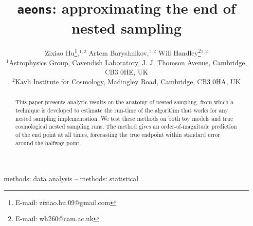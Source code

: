 \documentclass[usenatbib]{mnras}
\title[\texttt{aeons}]{\texttt{aeons}: approximating the end of nested sampling}
\author[Z. Hu et al.]{Zixiao Hu\thanks{E-mail: zixiao.hu.09@gmail.com},$^{1,2}$  Artem Baryshnikov,$^{1,2}$  Will Handley\thanks{E-mail: wh260@cam.ac.uk}$^{1,2}$
\\
$^{1}$Astrophysics Group, Cavendish Laboratory, J. J. Thomson Avenue, Cambridge, CB3 0HE, UK\\
$^{2}$Kavli Institute for Cosmology, Madingley Road, Cambridge, CB3 0HA, UK
}
\begin{document}
\label{firstpage}
\pagerange{\pageref{firstpage}--\pageref{lastpage}}
\maketitle


\begin{abstract}
    This paper presents analytic results on the anatomy of nested sampling, from which a technique is developed to estimate the run-time of the algorithm that works for any nested sampling implementation. We test these methods on both toy models and true cosmological nested sampling runs. The method gives an order-of-magnitude prediction of the end point at all times, forecasting the true endpoint within standard error around the halfway point.  
\end{abstract}

\begin{keywords}
methods: data analysis -- methods: statistical
\end{keywords}
\end{document}
